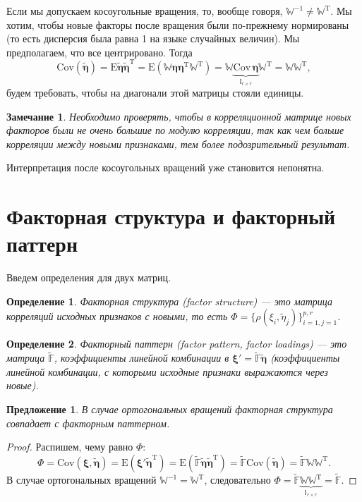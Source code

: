 \documentclass[specialist, 12pt,
subf, %
href, colorlinks=true,
substylefile = spbu.rtx,
]{disser}
\newtheorem{proposition}{Предложение}
\newtheorem{definition}{Определение}
\newtheorem{remark}{Замечание}
\begin{document}
Если мы допускаем косоугольные вращения, то, вообще говоря, $\mathbb{W}^{-1}\ne\mathbb{W}^{\mathrm{T}}$. Мы хотим, чтобы новые факторы после вращения были по-прежнему нормированы (то есть дисперсия была равна 1 на языке случайных величин). Мы предполагаем, что все центрировано. Тогда
\begin{equation*}
\text{Cov}(\widetilde{\bm\eta})=\mathrm{E}\widetilde{\bm\eta}\widetilde{\bm\eta}^\mathrm{T} = \mathrm{E}(\mathbb{W}\bm\eta\bm\eta^\mathrm{T}\mathbb{W}^\mathrm{T}) = \mathbb{W} \underbrace{\text{Cov}\,\bm\eta}_{\mathbb{I}_{r\times r}} \mathbb{W}^\mathrm{T} = \mathbb{W}\mathbb{W}^\mathrm{T},
\end{equation*}
будем требовать, чтобы на диагонали этой матрицы стояли единицы.

\begin{remark}
	Необходимо проверять, чтобы в корреляционной матрице новых факторов были не очень большие по модулю корреляции, так как чем больше корреляции между новыми признаками, тем более подозрительный результат.
\end{remark}

Интерпретация после косоугольных вращений уже становится непонятна.

\newpage
\section{Факторная структура и факторный паттерн}

Введем определения для двух матриц.

\begin{definition}
	Факторная структура (factor structure) --- это матрица корреляций исходных признаков с новыми, то есть $\Phi = \{\rho(\xi_i,\widetilde{\eta}_j)\}_{i=1,j=1}^{p,r}$.
\end{definition}

\begin{definition}
	Факторный паттерн (factor pattern, factor loadings) --- это матрица $\widetilde{\mathbb{F}}$, коэффициенты линейной комбинации в $\bm\xi'=\widetilde{\mathbb{F}}\widetilde{\bm\eta}$ (коэффициенты линейной комбинации, с которыми исходные признаки выражаются через новые).
\end{definition}

\begin{proposition}
	В случае ортогональных вращений факторная структура совпадает с факторным паттерном.
\end{proposition}
\begin{proof}
Распишем, чему равно $\Phi$:
\begin{equation*}
\Phi = \text{Cov}(\bm\xi,\widetilde{\bm\eta})=\mathrm{E}(\bm\xi'\widetilde{\bm\eta}^\mathrm{T}) = \mathrm{E}(\widetilde{\mathbb{F}}\widetilde{\bm\eta}\widetilde{\bm\eta}^\mathrm{T}) = \widetilde{\mathbb{F}}\text{Cov}(\widetilde{\bm\eta}) =  \widetilde{\mathbb{F}}\mathbb{W}\mathbb{W}^\mathrm{T}.
\end{equation*}
В случае ортогональных вращений $\mathbb{W}^{-1}=\mathbb{W}^{\mathrm{T}}$, следовательно $\Phi = \widetilde{\mathbb{F}}\underbrace{\mathbb{W}\mathbb{W}^\mathrm{T}}_{\mathbb{I}_{r \times r}} = \widetilde{\mathbb{F}}$.
\end{proof}
\end{document}
